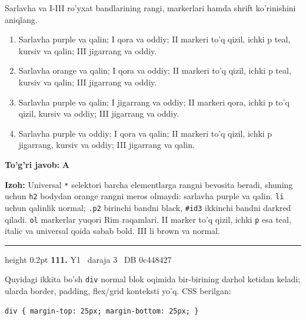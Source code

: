 \documentclass[10pt,a4paper,oneside]{article}
\begin{document}
\par
Sarlavha va I-III ro'yxat bandlarining rangi, markerlari hamda shrift ko'rinishini aniqlang.
\begin{enumerate}[label=\Alph*),leftmargin=9mm]
\item Sarlavha purple va qalin; I qora va oddiy; II markeri to'q qizil, ichki p teal, kursiv va qalin; III jigarrang va oddiy.
\item Sarlavha orange va qalin; I qora va oddiy; II markeri to'q qizil, ichki p teal, kursiv va qalin; III jigarrang va oddiy.
\item Sarlavha purple va qalin; I jigarrang va oddiy; II markeri qora, ichki p to'q qizil, kursiv va oddiy; III jigarrang va oddiy.
\item Sarlavha purple va oddiy; I qora va qalin; II markeri to'q qizil, ichki p jigarrang, kursiv va oddiy; III jigarrang va qalin.
\end{enumerate}
\begin{tcolorbox}[enhanced,breakable,colback=teal!4,colframe=teal!45!black,boxrule=0.45pt,arc=1.2mm,left=2.8mm,right=2.8mm,top=2mm,bottom=2mm,before skip=2mm,after skip=2mm]
\textbf{\color{teal}To'g'ri javob:} \textbf{A}
\par\smallskip
\textbf{Izoh:} Universal \texttt{*} selektori barcha elementlarga rangni bevosita beradi, shuning uchun \texttt{h2} bodydan orange rangni meros olmaydi: sarlavha purple va qalin. \texttt{li} uchun qalinlik normal; \texttt{.p2} birinchi bandni black, \texttt{\#id3} ikkinchi bandni darkred qiladi. \texttt{ol} markerlar yuqori Rim raqamlari. II marker to'q qizil, ichki \texttt{p} esa teal, italic va universal qoida sabab bold. III li brown va normal.
\end{tcolorbox}
\vspace{2mm}\hrule height 0.2pt \vspace{4mm}
\hypertarget{q111}{\textbf{\color{ink}111.}}  {\color{muted}\scriptsize Y1 \textbullet\ daraja 3 \textbullet\ DB 0c448427}
\par
Quyidagi ikkita bo'sh \texttt{div} normal blok oqimida bir-birining darhol ketidan keladi; ularda border, padding, flex/grid konteksti yo'q. CSS berilgan:

\par
\begin{lstlisting}
div { margin-top: 25px; margin-bottom: 25px; }
\end{lstlisting}
\end{document}
